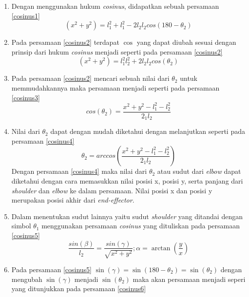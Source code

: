 \begin{enumerate}
	\item Dengan menggunakan hukum \textit{cosinus}, didapatkan sebuah persamaan \ref{cosinus1}
	\begin{equation}
	(x^2+y^2)=l_{1}^2+l_{1}^2-2l_{2}l_{2}cos(180-\theta_{2})
	\label{cosinus1}
	\end{equation}
	\item Pada persamaan \ref{cosinus2} terdapat $\cos$ yang dapat diubah sesuai dengan prinsip dari hukum \textit{cosinus} menjadi seperti pada persamaan \ref{cosinus2}
	\begin{equation}
	(x^2+y^2)=l_{1}^2l_{2}^2+2l_{2}l_{2}cos(\theta_{2})
	\label{cosinus2}
	\end{equation}
	\item Pada persamaan \ref{cosinus2} mencari sebuah nilai dari $\theta_{2}$ untuk memmudahkannya maka persamaan menjadi seperti pada persamaan \ref{cosinus3}
	\begin{equation}
	cos(\theta_{2})=\frac{x^2+y^2-l_{1}^2-l_{2}^2}{2_{1}l_{2}}
	\label{cosinus3}
	\end{equation}
	\item Nilai dari $\theta_{2}$ dapat dengan mudah diketahui dengan melanjutkan seperti pada persamaan \ref{cosinus4}
	\begin{equation}
	\theta_{2}=arccos(\frac{x^2+y^2-l_{1}^2-l_{2}^2}{2_{1}l_{2}})
		\label{cosinus4}
	\end{equation}
	Dengan persamaan \ref*{cosinus4} maka nilai dari $\theta_{2}$ atau sudut dari \textit{elbow} dapat diketahui dengan cara memasukkan nilai posisi x, posisi y, serta panjang dari \textit{shoulder} dan \textit{elbow} ke dalam persamaan. Nilai posisi x dan posisi y merupakan posisi akhir dari \textit{end-effector}. 
	\item Dalam menentukan sudut lainnya yaitu sudut \textit{shoulder} yang ditandai dengan simbol $\theta_{1}$ menggunakan persamaan \textit{cosinus} yang dituliskan pada persamaan \ref{cosinus5}
	\begin{equation}
	\frac{sin(\beta)}{l_{2}} = \frac{sin(\gamma)}{\sqrt{x^2+y^2}} ; \alpha=\arctan(\frac{y}{x})
	\label{cosinus5}
	\end{equation}
	\item Pada persamaan \ref{cosinus5} $\sin(\gamma)=\sin(180-\theta_{2})=\sin(\theta_{2})$ dengan mengubah $\sin(\gamma)$ menjadi $\sin(\theta_{2})$ maka akan persamaan menjadi seperi yang ditunjukkan pada persamaan \ref{cosinus6}
	\begin{equation}

\end{equation}
\end{enumerate}
